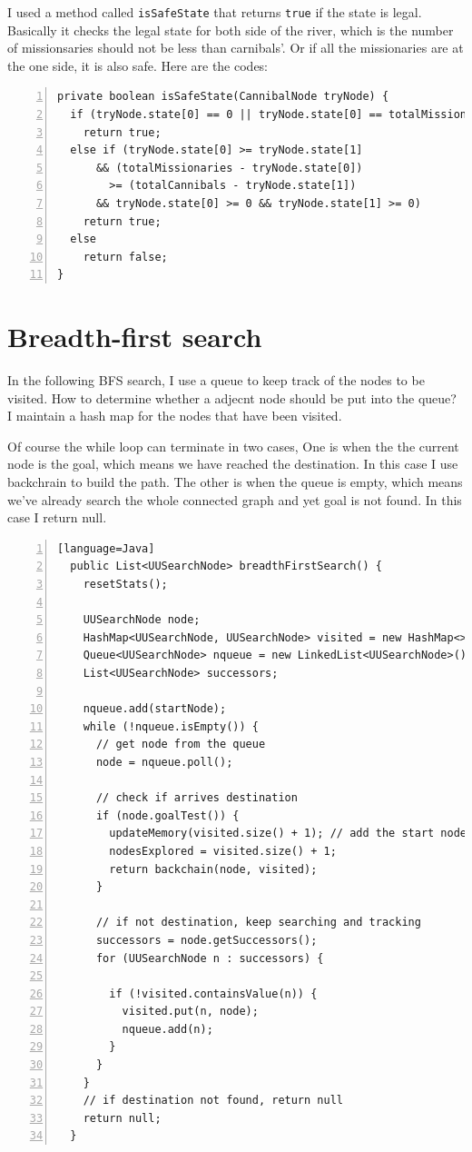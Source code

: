 \documentclass{article}
\begin{document}
I used a method called \verb`isSafeState` that returns \verb`true` if the state is legal. Basically it checks the legal state for both side of the river, which is the number of missionsaries should not be less than carnibals'. Or if all the missionaries are at the one side, it is also safe. Here are the codes:

\begin{lstlisting}[numbers=left]
private boolean isSafeState(CannibalNode tryNode) {
  if (tryNode.state[0] == 0 || tryNode.state[0] == totalMissionaries)
    return true;
  else if (tryNode.state[0] >= tryNode.state[1]
      && (totalMissionaries - tryNode.state[0])
      	>= (totalCannibals - tryNode.state[1])
      && tryNode.state[0] >= 0 && tryNode.state[1] >= 0)
    return true;
  else
    return false;
}
\end{lstlisting}



\section{Breadth-first search}

In the following BFS search, I use a queue to keep track of the nodes to be visited. How to determine whether a adjecnt node should be put into the queue? I maintain a hash map for the nodes that have been visited.

Of course the while loop can terminate in two cases, One is when the the current node is the goal, which means we have reached the destination. In this case I use backchrain to build the path. The other is when the queue is empty, which means we've already search the whole connected graph and yet goal is not found. In this case I return null.

\begin{lstlisting}[numbers=left][language=Java]
  public List<UUSearchNode> breadthFirstSearch() {
    resetStats();

    UUSearchNode node;
    HashMap<UUSearchNode, UUSearchNode> visited = new HashMap<>();
    Queue<UUSearchNode> nqueue = new LinkedList<UUSearchNode>();
    List<UUSearchNode> successors;

    nqueue.add(startNode);
    while (!nqueue.isEmpty()) {
      // get node from the queue
      node = nqueue.poll();

      // check if arrives destination
      if (node.goalTest()) {
        updateMemory(visited.size() + 1); // add the start node
        nodesExplored = visited.size() + 1;
        return backchain(node, visited);
      }

      // if not destination, keep searching and tracking
      successors = node.getSuccessors();
      for (UUSearchNode n : successors) {

        if (!visited.containsValue(n)) {
          visited.put(n, node);
          nqueue.add(n);
        }
      }
    }
    // if destination not found, return null
    return null;
  }
\end{lstlisting}
\end{document}
